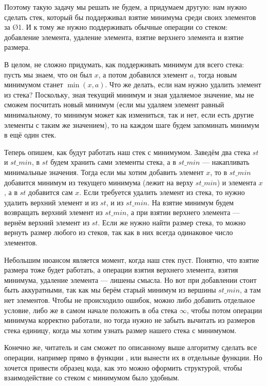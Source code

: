 Поэтому такую задачу мы решать не будем, а придумаем другую: нам нужно сделать стек, который бы поддерживал взятие минимума среди своих элементов за \O{1}. И к тому же нужно поддерживать обычные операции со стеком: добавление элемента, удаление элемента, взятие верхнего элемента и взятие размера.

В целом, не сложно придумать, как поддерживать минимум для всего стека: пусть мы знаем, что он был $x$, а потом добавился элемент $a$, тогда новым минимумом станет $\min(x, a)$. Что же делать, если нам нужно удалить элемент из стека? Поскольку, зная текущий минимум и зная удаляемое значение, мы не сможем посчитать новый минимум (если мы удаляем элемент равный минимальному, то минимум может как измениться, так и нет, если есть другие элементы с таким же значением), то на каждом шаге будем запоминать минимум в ещё один стек.

Теперь опишем, как будут работать наш стек с минимумом. Заведём два стека $st$ и $st\_min$, в $st$ будем хранить сами элементы стека, а в $st\_min$ — накапливать минимальные значения. Тогда если мы хотим добавить элемент $x$, то в $st\_min$ добавится минимум из текущего минимума (лежит на верху $st\_min$) и элемента $x$, а в $st$ добавится сам $x$. Если требуется удалить элемент из стека, то нужно удалить верхний элемент и из $st$, и из $st\_min$. На взятие минимум будем возвращать верхний элемент из $st\_min$, а при взятии верхнего элемента — вернём верхний элемент из $st$. Если же нужно найти размер стека, то можно вернуть размер любого из стеков, так как в них всегда одинаковое число элементов.

Небольшим нюансом является момент, когда наш стек пуст. Понятно, что взятие размера тоже будет работать, а операции взятия верхнего элемента, взятия минимума, удаление элемента — лишены смысла. Но вот при добавлении стоит быть аккуратными, так как мы берём старый минимум из вершины $st\_min$, а там нет элементов. Чтобы не происходило ошибок, можно либо добавить отдельное условие, либо же в самом начале положить в оба стека $\infty$, чтобы потом операции минимума корректно работали, но тогда нужно не забыть вычитать из размеров стека единицу, когда мы хотим узнать размер нашего стека с минимумом.

Конечно же, читатель и сам сможет по описанному выше алгоритму сделать все операции, например прямо в функции , или вынести их в отдельные функции. Но хочется привести образец кода, как это можно оформить структурой, чтобы взаимодействие со стеком с минимумом было удобным.

